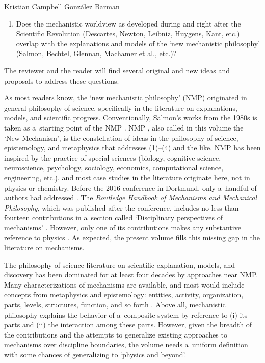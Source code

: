 \begin{recengenv}{Kristian Campbell González Barman}
\begin{enumerate}[label={(\arabic*)}]
\item Does the mechanistic worldview as developed during and right after the Scientific Revolution (Descartes, Newton, Leibniz, Huygens, Kant, etc.) overlap with the explanations and models of the ‘new mechanistic philosophy' (Salmon, Bechtel, Glennan, Machamer et al., etc.)?
\end{enumerate}

The reviewer and the reader will find several original and new ideas and proposals to address these questions.

As most readers know, the ‘new mechanistic philosophy' (NMP) originated in general philosophy of science, specifically in the literature on explanations, models, and scientific progress. Conventionally, Salmon's works from the 1980s is taken as a~starting point of the NMP
\parencites[][]{salmon_scientific_1984}[][]{salmon_four_1989}. %
 NMP 
\parencites[][]{glennan_new_2017}[][]{illari_routledge_2017}, %
 also called in this volume the ‘New Mechanism', is the constellation of ideas in the philosophy of science, epistemology, and metaphysics that addresses (1)–(4) and the like. NMP has been inspired by the practice of special sciences (biology, cognitive science, neuroscience, psychology, sociology, economics, computational science, engineering, etc.), and most case studies in the literature originate here, not in physics or chemistry. Before the 2016 conference in Dortmund, only a~handful of authors had addressed 
\parencites[][]{illari_what_2011}[][]{kuhlmann_relation_2014}. %
 The \textit{Routledge Handbook of Mechanisms and Mechanical Philosophy}, which was published after the conference, includes no less than fourteen contributions in a~section called ‘Disciplinary perspectives of mechanisms' 
\parencite[][]{illari_routledge_2017}. %
 However, only one of its contributions makes any substantive reference to physics 
\parencite[][]{kuhlmann_mechanisms_2017}. %
 As expected, the present volume fills this missing gap in the literature on mechanisms.

The philosophy of science literature on scientific explanation, models, and discovery has been dominated for at least four decades by approaches near NMP. Many characterizations of mechanisms are available, and most would include concepts from metaphysics and epistemology: entities, activity, organization, parts, levels, structures, function, and so forth
\parencite[][]{illari_routledge_2017}. %
 Above all, mechanistic philosophy explains the behavior of a~composite system by reference to (i) its parts and (ii) the interaction among these parts. However, given the breadth of the contributions and the attempts to generalize existing approaches to mechanisms over discipline boundaries, the volume needs a~uniform definition with some chances of generalizing to ‘physics and beyond'.


\end{recengenv}
